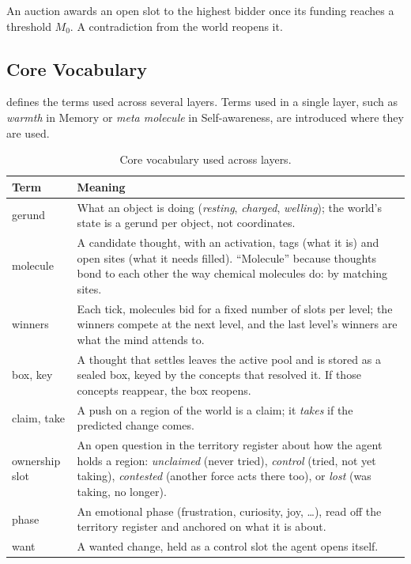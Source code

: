 \documentclass[11pt]{article}
\theoremstyle{remark}
\begin{document}
An auction awards an open slot to the highest bidder once its funding reaches a threshold
$M_0$. A contradiction from the world reopens it.

\subsection{Core Vocabulary}

 defines the terms used across several layers. Terms used in a single
layer, such as \emph{warmth} in Memory or \emph{meta molecule} in Self-awareness, are
introduced where they are used.

\begin{table}[t]
\centering
\small
\begin{tabular}{@{}lp{12.2cm}@{}}
\toprule
Term & Meaning \\
\midrule
gerund & What an object is doing (\emph{resting}, \emph{charged}, \emph{welling}); the
world's state is a gerund per object, not coordinates. \\
molecule & A candidate thought, with an activation, tags (what it is) and open sites (what
it needs filled). ``Molecule'' because thoughts bond to each other the way chemical
molecules do: by matching sites. \\
winners & Each tick, molecules bid for a fixed number of slots per level; the winners
compete at the next level, and the last level's winners are what the mind attends to. \\
box, key & A thought that settles leaves the active pool and is stored as a sealed box,
keyed by the concepts that resolved it. If those concepts reappear, the box reopens. \\
claim, take & A push on a region of the world is a claim; it \emph{takes} if the predicted
change comes. \\
ownership slot & An open question in the territory register about how the agent holds a
region: \emph{unclaimed} (never tried), \emph{control} (tried, not yet taking),
\emph{contested} (another force acts there too), or \emph{lost} (was taking, no longer). \\
phase & An emotional phase (frustration, curiosity, joy, \dots), read off the territory
register and anchored on what it is about. \\
want & A wanted change, held as a control slot the agent opens itself. \\
\bottomrule
\end{tabular}
\caption{Core vocabulary used across layers.}
\label{tab:vocabulary}
\end{table}
\end{document}
